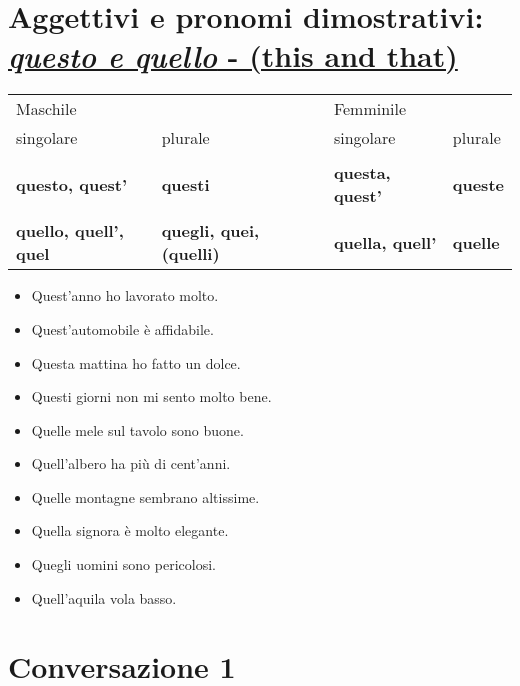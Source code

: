 \documentclass[letter,11pt]{article}
\begin{document}
\section*{Aggettivi e pronomi dimostrativi:
\underline{\emph{questo e quello} - (this and that)}}
\vskip 0.2in

\begin{tabular}{ |p{3cm}| p{3cm}| p{1cm}| p{3cm}| p{3cm}|}
    Maschile  &  &  & Femminile &  \\
    singolare & plurale &  & singolare & plurale  \\
    \hline
    \hline
     &  &  &  &  \\ \hline
    {\bf questo, quest'}  & {\bf questi} &   & {\bf questa, quest'} & {\bf queste}   \\ \hline
    &  &  &   &  \\ \hline
    {\bf quello, quell', quel}  & {\bf quegli, quei, (quelli)} &   & {\bf quella, quell'} & {\bf quelle}   \\ \hline
    \hline
\end{tabular}

\vskip 0.4in

\begin{multicols}{2}
\begin{itemize}
    \item Quest'anno ho lavorato molto.
    \item Quest'automobile è affidabile.
    \item Questa mattina ho fatto un dolce.
    \item Questi giorni non mi sento molto bene.
    \item Quelle mele sul tavolo sono buone.
    \item Quell'albero ha più di cent'anni.
    \item Quelle montagne sembrano altissime.
    \item Quella signora è molto elegante.
    \item Quegli uomini sono pericolosi.
    \item Quell'aquila vola basso.


\end{itemize}
\end{multicols}
\vskip 0.2in

\section*{Conversazione 1}
\vskip 0.2in
\end{document}

